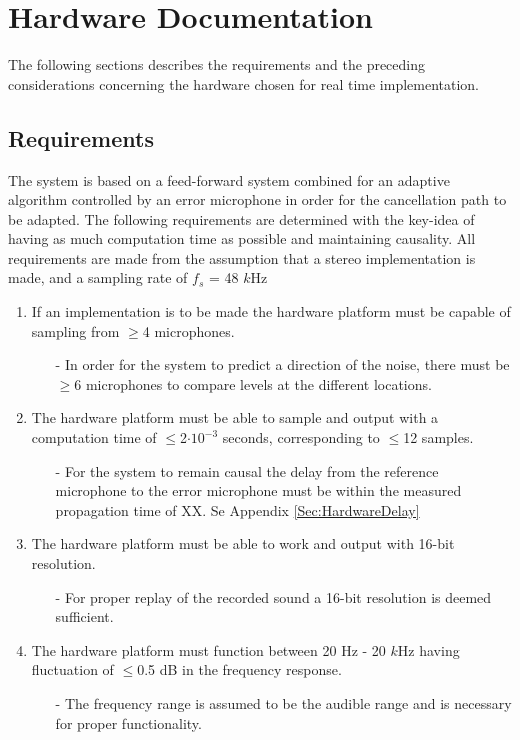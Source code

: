 \section{Hardware Documentation}\label{sec:HardwareDocumentation}

The following sections describes the requirements and the preceding considerations concerning the hardware chosen for real time implementation. 

\subsection{Requirements}\label{subsec:Requirements}

The system is based on a feed-forward system combined for an adaptive algorithm controlled by an error microphone in order for the cancellation path to be adapted. The following requirements are determined with the key-idea of having as much computation time as possible and maintaining causality.
All requirements are made from the assumption that a stereo implementation is made, and a sampling rate of $f_{s}$ = 48 $k$Hz
\begin{enumerate}
	
	\item If an implementation is to be made the hardware platform must be capable of sampling from $\geq$4 microphones.\label{Req:NoOfMic}
	\begin{itemize}
		\item[-]In order for the system to predict a direction of the noise, there must be $\geq$6 microphones to compare levels at the different locations.
	\end{itemize}
	
	\item The hardware platform must be able to sample and output with a computation time of $\leq$2$\cdot 10 ^{-3}$ seconds, corresponding to $\leq$12 samples.\label{Req:NoOfSamples}
	\begin{itemize}
		\item[-]For the system to remain causal the delay from the reference microphone to the error microphone must be within the measured propagation time of XX. Se Appendix \autoref{Sec:HardwareDelay}
	\end{itemize}
	
	\item The hardware platform must be able to work and output with 16-bit resolution.\label{Req:DSPResolution}
	\begin{itemize}
		\item[-] For proper replay of the recorded sound a 16-bit resolution is deemed sufficient. 
	\end{itemize}
	
	\item The hardware platform must function between 20 Hz - 20 $k$Hz having fluctuation of $\leq$0.5 dB in the frequency response.\label{Req:DSPFrequencyArea}
	\begin{itemize}
		\item[-] The frequency range is assumed to be the audible range and is necessary for proper functionality.
	\end{itemize}
\end{enumerate} 

